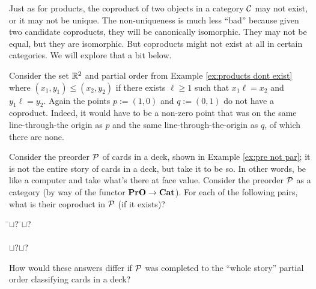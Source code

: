 \documentclass[CT4S-EN-RU]{subfiles}
\begin{document}
\begin{exampleRUS}
\end{exampleRUS}

\begin{blockENG}
Just as for products, the coproduct of two objects in a category $\mathcal{C}$ may not exist, or it may not be unique. The non-uniqueness is much less “bad” because given two candidate coproducts, they will be canonically isomorphic. They may not be equal, but they are isomorphic. But coproducts might not exist at all in certain categories. We will explore that a bit below.
\end{blockENG}

\begin{blockRUS}
\end{blockRUS}

\begin{exampleENG}
Consider the set ${\mathbb R}^2$ and partial order from Example \ref{ex:products dont exist} where $(x_1,y_1)\leq (x_2,y_2)$ if there exists $\ell\geq 1$ such that $x_1\ell=x_2$ and $y_1\ell=y_2$. Again the points $p:=(1,0)$ and $q:=(0,1)$ do not have a coproduct. Indeed, it would have to be a non-zero point that was on the same line-through-the origin as $p$ and the same line-through-the-origin as $q$, of which there are none.
\end{exampleENG}

\begin{exampleRUS}
\end{exampleRUS}

\begin{exerciseENG}
Consider the preorder $\mathcal{P}$ of cards in a deck, shown in Example \ref{ex:pre not par}; it is not the entire story of cards in a deck, but take it to be so. In other words, be like a computer and take what's there at face value. Consider the preorder $\mathcal{P}$ as a category (by way of the functor ${\bf PrO}\rightarrow{\bf Cat}$). For each of the following pairs, what is their coproduct in $\mathcal{P}$ (if it exists)?
\sexc 
\begin{tabbing}
\hspace{.5in}\= $\sqcup$\;?\hspace{.5in} \=$\sqcup$\;?\\\\
\> $\sqcup$\;?\>$\sqcup$\;?
\end{tabbing}
\item How would these answers differ if $\mathcal{P}$ was completed to the “whole story” partial order classifying cards in a deck?
\endsexc
\end{exerciseENG}
\end{document}
